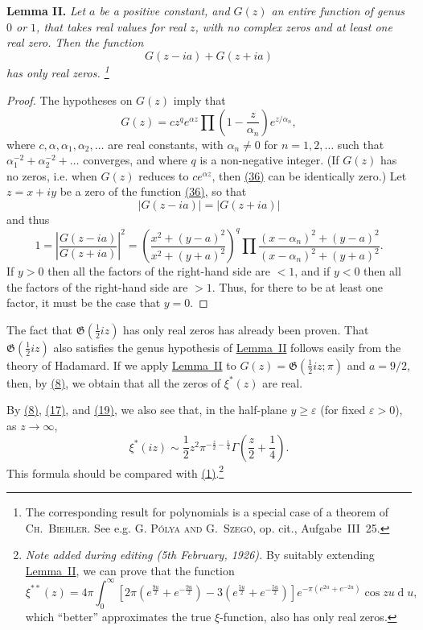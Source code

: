 \documentclass{article}
\theoremstyle{plain}
\newenvironment{itenv}[1]
  {\phantomsection\par\medskip\noindent\textbf{#1.}\itshape}
  {\medskip}
\newcommand{\dd}{\operatorname{d}\!}
\newcommand{\GG}{\mathfrak{G}}
\newcommand{\oldpage}[1]{\marginpar{\footnotesize$\Big\vert$ \textit{p.~#1}}}
\begin{document}
\begin{itenv}{Lemma II}
\label{lemma2}
  Let $a$ be a positive constant, and $G(z)$ an entire function of genus $0$ or $1$, that takes real values for real $z$, with no complex zeros and at least one real zero.
  Then the function
  \[
  \label{36}
    G(z-ia) + G(z+ia)
  \tag{36}
  \]
  has only real zeros.
  \footnote{The corresponding result for polynomials is a special case of a theorem of \textsc{Ch.~Biehler}. See e.g. \textsc{G. P\'{o}lya and G.~Szeg\"{o}}, op. cit., Aufgabe~III~25.}
\end{itenv}
\begin{proof}
  The hypotheses on $G(z)$ imply that
  \[
    G(z) = c z^q e^{\alpha z} \prod\left(1-\frac{z}{\alpha_n}\right)e^{z/\alpha_n},
  \]
  where $c,\alpha,\alpha_1,\alpha_2,\ldots$ are real constants, with $\alpha_n\neq0$ for $n=1,2,\ldots$ such that $\alpha_1^{-2}+\alpha_2^{-2}+\ldots$ converges, and where $q$ is a non-negative integer.
  (If $G(z)$ has no zeros, i.e. when $G(z)$ reduces to $ce^{\alpha z}$, then \hyperref[36]{(36)} can be identically zero.)
  Let $z=x+iy$ be a zero of the function \hyperref[36]{(36)}, so that
  \[
    |G(z-ia)| = |G(z+ia)|
  \]
  and thus
  \[
    1
    =
    \left\vert
      \frac{G(z-ia)}{G(z+ia)}
    \right\vert^2
    =
    \left(
      \frac{x^2+(y-a)^2}{x^2+(y+a)^2}
    \right)^q
    \prod \frac{(x-\alpha_n)^2+(y-a)^2}{(x-\alpha_n)^2+(y+a)^2}.
  \]
\oldpage{317}
  If $y>0$ then all the factors of the right-hand side are $<1$, and if $y<0$ then all the factors of the right-hand side are $>1$.
  Thus, for there to be at least one factor, it must be the case that $y=0$.
\end{proof}

The fact that $\GG(\frac12 iz)$ has only real zeros has already been proven.
That $\GG(\frac12 iz)$ also satisfies the genus hypothesis of \hyperref[lemma2]{Lemma~II} follows easily from the theory of Hadamard.
If we apply \hyperref[lemma2]{Lemma~II} to $G(z)=\GG(\frac12 iz;\pi)$ and $a=9/2$, then, by \hyperref[8]{(8)}, we obtain that all the zeros of $\xi^*(z)$ are real.

By \hyperref[8]{(8)}, \hyperref[17]{(17)}, and \hyperref[19]{(19)}, we also see that, in the half-plane $y\geqslant\varepsilon$ (for fixed $\varepsilon>0$), as $z\to\infty$,
\[
  \xi^*(iz) \sim \frac12 z^2 \pi^{-\frac{z}{2}-\frac14} \Gamma\left(\frac{z}{2}+\frac14\right).
\]
This formula should be compared with \hyperref[1]{(1)}.\footnote{\emph{Note added during editing (5th February, 1926).} By suitably extending \hyperref[lemma2]{Lemma~II}, we can prove that the function%
\[%
  \xi^{**}(z) = 4\pi\int_0^\infty\left[%
    2\pi\left(%
      e^{\frac{9u}{2}} + e^{-\frac{9u}{2}}%
    \right)%
    -3\left(%
      e^{\frac{5u}{2}} + e^{-\frac{5u}{2}}%
    \right)%
  \right]%
  e^{-\pi(e^{2u}+e^{-2u})} \cos zu \dd u,%
\]%
which ``better'' approximates the true $\xi$-function, also has only real zeros.}
\end{document}
